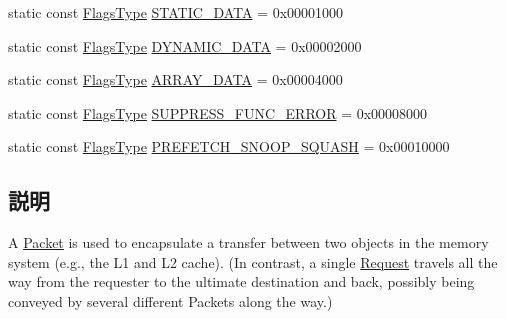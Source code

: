 \begin{DoxyCompactItemize}
\item 
static const \hyperlink{classPacket_a2da503161d95c65aea559dbabcf570aa}{FlagsType} \hyperlink{classPacket_a1736ff591124f446ce3ddbb16fb3f505}{STATIC\_\-DATA} = 0x00001000
\item 
static const \hyperlink{classPacket_a2da503161d95c65aea559dbabcf570aa}{FlagsType} \hyperlink{classPacket_a0100d751aaef8a927f7ba551550d142b}{DYNAMIC\_\-DATA} = 0x00002000
\item 
static const \hyperlink{classPacket_a2da503161d95c65aea559dbabcf570aa}{FlagsType} \hyperlink{classPacket_a861863488f543d1fd5aaf422469ba27a}{ARRAY\_\-DATA} = 0x00004000
\item 
static const \hyperlink{classPacket_a2da503161d95c65aea559dbabcf570aa}{FlagsType} \hyperlink{classPacket_a5e3b50f943fac776d71dbe3ff03cc7a5}{SUPPRESS\_\-FUNC\_\-ERROR} = 0x00008000
\item 
static const \hyperlink{classPacket_a2da503161d95c65aea559dbabcf570aa}{FlagsType} \hyperlink{classPacket_ae2bdbe737a4cf46b8bedebcaa602d23a}{PREFETCH\_\-SNOOP\_\-SQUASH} = 0x00010000
\end{DoxyCompactItemize}


\subsection{説明}
A \hyperlink{classPacket}{Packet} is used to encapsulate a transfer between two objects in the memory system (e.g., the L1 and L2 cache). (In contrast, a single \hyperlink{classRequest}{Request} travels all the way from the requester to the ultimate destination and back, possibly being conveyed by several different Packets along the way.) 

